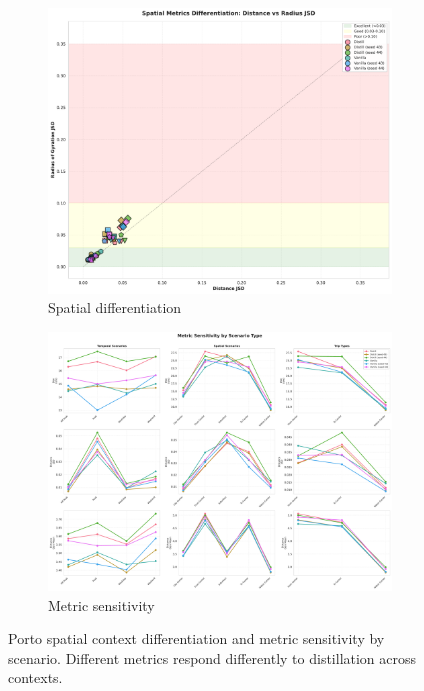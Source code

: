 \begin{figure}[H]
    \centering
    \begin{subfigure}{0.49\linewidth}
        \centering
        \includegraphics[width=\linewidth]{assets/plots/eval/porto/scenarios/spatial_metrics_differentiation.pdf}
        \caption{Spatial differentiation}
    \end{subfigure}
    \begin{subfigure}{0.49\linewidth}
        \centering
        \includegraphics[width=\linewidth]{assets/plots/eval/porto/scenarios/metric_sensitivity_by_scenario.pdf}
        \caption{Metric sensitivity}
    \end{subfigure}
    \caption{Porto spatial context differentiation and metric sensitivity by scenario. Different metrics respond differently to distillation across contexts.}
    \label{fig:appendix-porto-scenario-sensitivity}
\end{figure}

